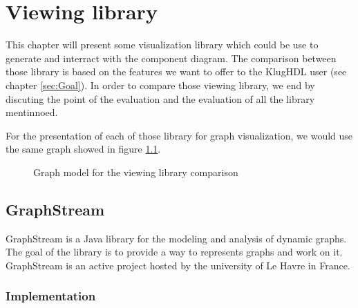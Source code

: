 \chapter{Viewing library} %
\label{cha:Viewing library}

This chapter will present some visualization library which could be use to generate and interract with the component diagram. The comparison between those library is based on the features we want to offer to the KlugHDL user (see chapter \ref{sec:Goal}). In order to compare those viewing library, we end by discuting the point of the evaluation and the evaluation of all the library mentinnoed.

For the presentation of each of those library for graph visualization, we would use the same graph showed in figure \ref{fig:graph-base-model}.

\begin{figure}[] %
    \centering
    \caption{Graph model for the viewing library comparison}
    \label{fig:graph-base-model}
\end{figure} %

\section{GraphStream} %
\label{sec:Graphstream}

GraphStream is a Java library for the modeling and analysis of dynamic graphs\cite{graphstream}. The goal of the library is to provide a way to represents graphs and work on it\cite{graphstream}. GraphStream is an active project hosted by the university of Le Havre in France.

\subsection{Implementation} %
\label{sub:Implementation}

